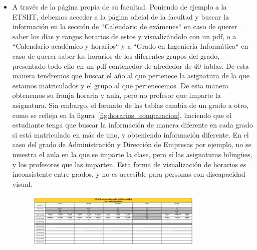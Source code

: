 \begin{itemize}
    \item A través de la página propia de su facultad. Poniendo de ejemplo a la ETSIIT, debemos acceder a la página oficial de la facultad \cite{webETSIIT} y buscar la información en la sección
          de ``Calendario de exámenes`` en caso de querer saber los días y rangos horarios de estos y visualizándolo con un pdf, o a ``Calendario académico y horarios`` y a ``Grado en Ingeniería Informática``
          en caso de querer saber los horarios de los diferentes grupos del grado, presentado todo ello en un pdf contenedor de alrededor de 40 tablas.
          \newline\newline
          De esta manera tendremos que buscar el año al que pertenece la asignatura de la que estamos matriculados y el grupo al que pertenecemos. De esta manera obtenemos su 
          franja horaria y aula, pero no profesor que imparte la asignatura.
          \newline\newline
          Sin embargo, el formato de las tablas cambia de un grado a otro, como se refleja en la figura~\ref{fig:horarios_comparacion}, haciendo que el estudiante tenga que buscar la información de manera diferente en cada grado si está matriculado en más de uno, 
          y obteniendo información diferente. En el caso del grado de Administración y Dirección de Empresas por ejemplo, no se muestra el aula en la que se imparte la clase, pero sí las asignaturas bilingües, y
          los profesores que las imparten.
          \newline\newline
          Esta forma de visualización de horarios es inconsistente entre grados, y no es accesible para personas con discapacidad visual.
          \newpage
            \begin{figure}[H]
                \centering
                \includegraphics[width=0.8\textwidth]{figures/02_etsiit_horario.png}

\end{figure}
\end{itemize}
